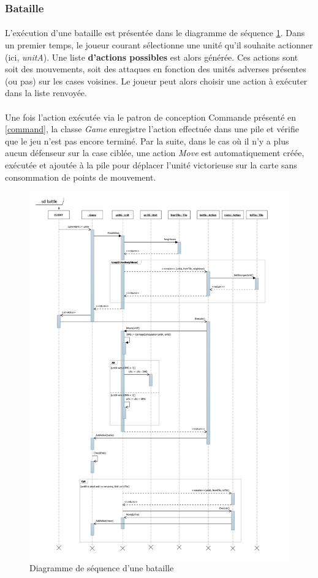 \subsubsection{Bataille}

\paragraph{}
L'exécution d'une bataille est présentée dans le diagramme de séquence \ref{fig:sd_battle}.
Dans un premier temps, le joueur courant sélectionne une unité qu'il souhaite actionner (ici, \emph{unitA}).
Une liste \textbf{d'actions possibles} est alors générée. Ces actions sont soit des mouvements, soit des attaques en fonction des unités adverses présentes (ou pas) sur les cases voisines.
Le joueur peut alors choisir une action à exécuter dans la liste renvoyée.

\paragraph{}
Une fois l'action exécutée via le patron de conception Commande présenté en \ref{command}, la classe \emph{Game} enregistre l'action effectuée dans une pile et vérifie que le jeu n'est pas encore terminé.
Par la suite, dans le cas où il n'y a plus aucun défenseur sur la case ciblée, une action \emph{Move} est automatiquement créée, exécutée et ajoutée à la pile pour déplacer l'unité victorieuse sur la carte sans consommation de points de mouvement.

\begin{figure}[h]
  \centering
  \includegraphics[width=13cm]{schemas/sd_battle.png}
  \caption{Diagramme de séquence d'une bataille}
  \label{fig:sd_battle}
\end{figure}
